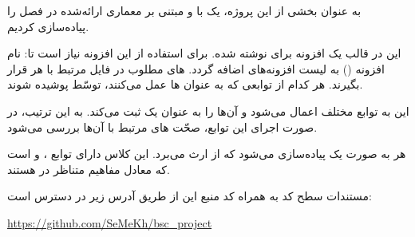 به عنوان بخشی از این پروژه، یک   با  و مبتنی بر معماری ارائه‌شده در فصل  را پیاده‌سازی کردیم.


این  در قالب یک افزونه برای  نوشته شده. برای استفاده از این افزونه نیاز است تا:
 نام افزونه () به لیست افزونه‌های  اضافه گردد.
 های مطلوب در فایل  مرتبط با هر   قرار بگیرند.
 هر کدام از توابعی که به عنوان  ها عمل می‌کنند، توسّط   پوشیده شوند.


این  به توابع مختلف اعمال می‌شود و آن‌ها را به عنوان یک   ثبت می‌کند. به این ترتیب، در صورت اجرای این توابع، صحّت های مرتبط با آن‌ها بررسی می‌شود.

هر  به صورت یک  پیاده‌سازی می‌شود که از  ارث می‌برد. این کلاس دارای توابع ،  و  است که معادل مفاهیم متناظر در  هستند.

مستندات سطح کد به همراه کد منبع این  از طریق آدرس زیر در دسترس است:

\begin{center}
\url{https://github.com/SeMeKh/bsc_project}
\end{center}

